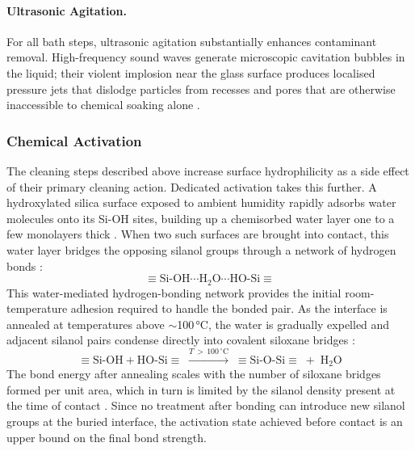\paragraph{Ultrasonic Agitation.}
For all bath steps, ultrasonic agitation substantially enhances 
contaminant removal. High-frequency sound waves generate microscopic 
cavitation bubbles in the liquid; their violent implosion near the 
glass surface produces localised pressure jets that dislodge particles 
from recesses and pores that are otherwise inaccessible to chemical 
soaking alone \cite{menon1989}.

\subsubsection*{Chemical Activation}

The cleaning steps described above increase surface hydrophilicity as 
a side effect of their primary cleaning action. Dedicated activation 
takes this further. A hydroxylated silica surface exposed to ambient 
humidity rapidly adsorbs water molecules onto its Si-OH sites, 
building up a chemisorbed water layer one to a few monolayers thick 
\cite{zhuravlev2000}. When two such surfaces are brought into contact, 
this water layer bridges the opposing silanol groups through a network 
of hydrogen bonds \cite{kissinger1990}:
%
\begin{equation}
    \equiv\!\mathrm{Si}\text{-}\mathrm{OH} \cdots 
    \mathrm{H_2O} \cdots 
    \mathrm{HO}\text{-}\mathrm{Si}\!\equiv
    \label{eq:hbond_water}
\end{equation}
%
This water-mediated hydrogen-bonding network provides the initial 
room-temperature adhesion required to handle the bonded pair. As the 
interface is annealed at temperatures above $\sim$100\,°C, the water 
is gradually expelled and adjacent silanol pairs condense directly 
into covalent siloxane bridges \cite{stengl1989,eichler2008}:
%
\begin{equation}
    \equiv\!\mathrm{Si}\text{-}\mathrm{OH} + 
    \mathrm{HO}\text{-}\mathrm{Si}\!\equiv 
    \;\xrightarrow{T\,>\,100\,^\circ\mathrm{C}}\; 
    \equiv\!\mathrm{Si}\text{-}\mathrm{O}\text{-}\mathrm{Si}\!\equiv 
    \;+\; \mathrm{H_2O}
    \label{eq:siloxane}
\end{equation}
%
The bond energy after annealing scales with the number of siloxane 
bridges formed per unit area, which in turn is limited by the silanol 
density present at the time of contact \cite{stengl1989, zhuravlev2000}. 
Since no treatment after bonding can introduce new silanol groups at the 
buried interface, the activation state achieved before contact is an 
upper bound on the final bond strength.

